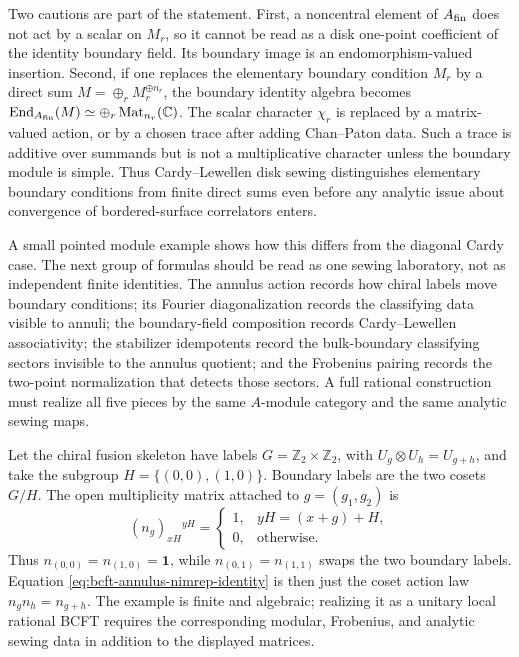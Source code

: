 Two cautions are part of the statement.  First, a noncentral element of
\(A_{\rm fin}\) does not act by a scalar on \(M_r\), so it cannot be read as
a disk one-point coefficient of the identity boundary field.  Its boundary
image is an endomorphism-valued insertion.  Second, if one replaces the
elementary boundary condition \(M_r\) by a direct sum
\(M=\oplus_r M_r^{\oplus n_r}\), the boundary identity algebra becomes
\(\operatorname{End}_{A_{\rm fin}}(M)\simeq\oplus_r\operatorname{Mat}_{n_r}(\mathbb C)\).
The scalar character \(\chi_r\) is replaced by a matrix-valued action, or by
a chosen trace after adding Chan--Paton data.  Such a trace is additive over
summands but is not a multiplicative character unless the boundary module is
simple.  Thus Cardy--Lewellen disk sewing distinguishes elementary boundary
conditions from finite direct sums even before any analytic issue about
convergence of bordered-surface correlators enters.

A small pointed module example shows how this differs from the diagonal Cardy
case.  The next group of formulas should be read as one sewing laboratory,
not as independent finite identities.  The annulus action records how chiral
labels move boundary conditions; its Fourier diagonalization records the
classifying data visible to annuli; the boundary-field composition records
Cardy--Lewellen associativity; the stabilizer idempotents record the
bulk-boundary classifying sectors invisible to the annulus quotient; and the
Frobenius pairing records the two-point normalization that detects those
sectors.  A full rational construction must realize all five pieces by the
same \(A\)-module category and the same analytic sewing maps.

Let the chiral fusion skeleton have labels
\(G=\mathbb Z_2\times\mathbb Z_2\), with
\(U_g\otimes U_h=U_{g+h}\), and take the subgroup
\(H=\{(0,0),(1,0)\}\).  Boundary labels are the two cosets \(G/H\).  The
open multiplicity matrix attached to \(g=(g_1,g_2)\) is
\begin{equation}
  (n_g)_{xH}{}^{yH}
  =
  \begin{cases}
  1,& yH=(x+g)+H,\\
  0,& \text{otherwise}.
  \end{cases}
  \label{eq:bcft-pointed-coset-nimrep}
\end{equation}
Thus \(n_{(0,0)}=n_{(1,0)}=\mathbf 1\), while
\(n_{(0,1)}=n_{(1,1)}\) swaps the two boundary labels.  Equation
\eqref{eq:bcft-annulus-nimrep-identity} is then just the coset action law
\(n_gn_h=n_{g+h}\).  The example is finite and algebraic; realizing it as a
unitary local rational BCFT requires the corresponding modular, Frobenius,
and analytic sewing data in addition to the displayed matrices.


